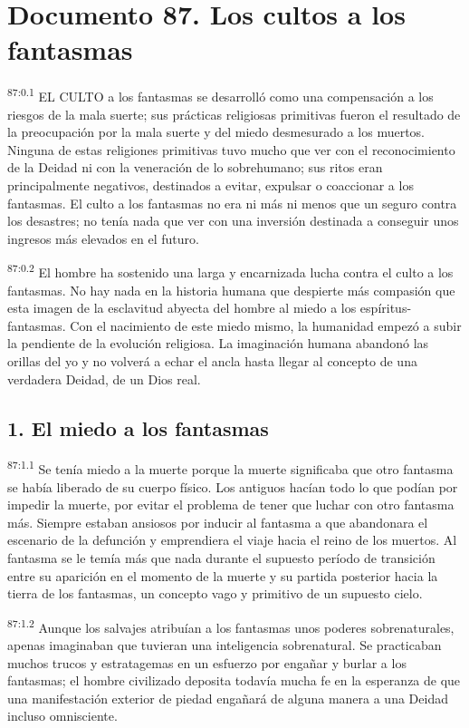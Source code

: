 \chapter{Documento 87. Los cultos a los fantasmas}
\par
\textsuperscript{87:0.1} EL CULTO a los fantasmas se desarrolló como una compensación a los riesgos de la mala suerte; sus prácticas religiosas primitivas fueron el resultado de la preocupación por la mala suerte y del miedo desmesurado a los muertos. Ninguna de estas religiones primitivas tuvo mucho que ver con el reconocimiento de la Deidad ni con la veneración de lo sobrehumano; sus ritos eran principalmente negativos, destinados a evitar, expulsar o coaccionar a los fantasmas. El culto a los fantasmas no era ni más ni menos que un seguro contra los desastres; no tenía nada que ver con una inversión destinada a conseguir unos ingresos más elevados en el futuro.

\par
\textsuperscript{87:0.2} El hombre ha sostenido una larga y encarnizada lucha contra el culto a los fantasmas. No hay nada en la historia humana que despierte más compasión que esta imagen de la esclavitud abyecta del hombre al miedo a los espíritus-fantasmas. Con el nacimiento de este miedo mismo, la humanidad empezó a subir la pendiente de la evolución religiosa. La imaginación humana abandonó las orillas del yo y no volverá a echar el ancla hasta llegar al concepto de una verdadera Deidad, de un Dios real.

\section*{1. El miedo a los fantasmas}
\par
\textsuperscript{87:1.1} Se tenía miedo a la muerte porque la muerte significaba que otro fantasma se había liberado de su cuerpo físico. Los antiguos hacían todo lo que podían por impedir la muerte, por evitar el problema de tener que luchar con otro fantasma más. Siempre estaban ansiosos por inducir al fantasma a que abandonara el escenario de la defunción y emprendiera el viaje hacia el reino de los muertos. Al fantasma se le temía más que nada durante el supuesto período de transición entre su aparición en el momento de la muerte y su partida posterior hacia la tierra de los fantasmas, un concepto vago y primitivo de un supuesto cielo.

\par
\textsuperscript{87:1.2} Aunque los salvajes atribuían a los fantasmas unos poderes sobrenaturales, apenas imaginaban que tuvieran una inteligencia sobrenatural. Se practicaban muchos trucos y estratagemas en un esfuerzo por engañar y burlar a los fantasmas; el hombre civilizado deposita todavía mucha fe en la esperanza de que una manifestación exterior de piedad engañará de alguna manera a una Deidad incluso omnisciente.

